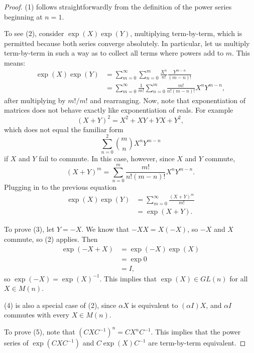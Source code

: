 \documentclass[12pt]{article}
\theoremstyle{definition}
\theoremstyle{definition}
\theoremstyle{definition}
\theoremstyle{definition}
\theoremstyle{definition}
\theoremstyle{definition}
\theoremstyle{definition}
\theoremstyle{definition}
\begin{document}
\begin{proof}
\par{(1) follows straightforwardly from the
definition of the power series beginning at
$n=1$.} 

\par{To see (2), consider
$\exp(X)\exp(Y)$, multiplying term-by-term, which
is permitted because both series converge
absolutely. In particular, let us multiply
term-by-term in such a way as to collect all terms
where powers add to $m$. This means:
\[
\begin{aligned}
    \exp(X) \exp(Y) & = \sum_{m=0}^{\infty}\sum_{n=0}^{m}\frac{X^n}{n!} \frac{Y^{m-n}}{(m-n)!}  \\
    & = \sum_{m=0}^{\infty}\frac{1}{m!}\sum_{n=0}^{m}\frac{m!}{n!(m-n)!}X^{n}Y^{m-n},
\end{aligned}
\] 
after multiplying by $m!/m!$ and rearranging. Now, note that exponentiation of matrices does not behave exactly like exponentiation of reals. For example 
\[
{(X+Y)}^2 = X^2 + XY + YX + Y^2,
\] 
which does not equal the familiar form
\[
\sum_{n=0}^2 \binom{m}{n}X^n Y^{m-n}
\] 
if $X$ and $Y$ fail to commute. In this case,
however, since $X$ and $Y$ commute,
\[
    {(X+Y)}^m = \sum_{n=0}^{m} \frac{m!}{n!(m-n)!}X^{n} Y^{m-n}.
\] 
Plugging in to the previous equation
\[
\begin{aligned}
    \exp(X)\exp(Y) & = \sum_{m=0}^{\infty}\frac{{(X+Y)}^{m}}{m!} \\ 
    & = \exp(X+Y).
\end{aligned}
\]}

\par{To prove (3), let $Y = -X$. We know that
$-XX = X(-X)$, so $-X$ and $X$ commute, so (2)
applies. Then 
\[
\begin{aligned}
    \exp(-X + X) & = \exp(-X) \exp(X) \\ 
    & = \exp 0 \\ 
    & = I,
\end{aligned}
\] 
so $\exp(-X) = {\exp(X)}^{-1}$. This implies that
$\exp(X) \in GL(n)$ for all $X \in M(n)$.}

\par{(4) is also a special case of (2), since
$\alpha X$ is equivalent to $(\alpha I)X$, and
$\alpha I$ commutes with every $X \in M(n)$.}

\par{To prove (5), note that ${(CXC^{-1})}^n =
CX^n C^{-1}$. This implies that the power series
of $\exp(CXC^{-1})$ and $C\exp(X)C^{-1}$ are
term-by-term equivalent.}
\end{proof}
\end{document}
